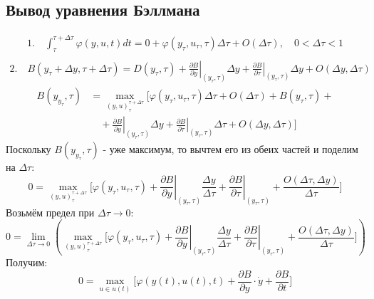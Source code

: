 \documentclass[a4paper,12pt]{article}
\begin{document}
{\subsection{Вывод уравнения Бэллмана}
\begin{align}
   1. \quad \int_{\tau}^{\tau + \Delta \tau} \varphi(y, u, t) dt = 0 + \varphi(y_{\tau}, u_{\tau}, \tau) \Delta \tau + O(\Delta \tau),\quad 0 < \Delta \tau < 1 \\
\end{align} 
\begin{align}
   2. \quad B(y_{\tau}+\Delta y, \tau + \Delta \tau) = D(y_{\tau},\tau) +  \left. \frac{\partial B}{\partial y} \right|_{(y_{\tau},\tau)} \! \Delta y + \left. \frac{\partial B}{\partial \tau} \right|_{(y_{\tau},\tau)} \! \Delta y + O(\Delta y, \Delta \tau)
\end{align}
\begin{align}
    B(y_{y_{\tau}},\tau) &= \max_{(y,u)_{\tau}^{\tau+\Delta \tau}} \biggl[ \varphi(y_{\tau}, u_{\tau}, \tau) \Delta \tau + O(\Delta \tau) + B(y_{\tau},\tau) \nonumber + \\
    &\quad + \left. \frac{\partial B}{\partial y} \right|_{(y_{\tau},\tau)}\! \Delta y + \left. \frac{\partial B}{\partial \tau} \right|_{(y_{\tau},\tau)}\! \Delta \tau + O(\Delta y,\Delta \tau) \biggr]
\end{align}
Поскольку $B(y_{y_{\tau}},\tau)$ - уже максимум, то вычтем его из обеих частей и поделим на $\Delta \tau$:
\[
    0 = \max_{(y,u)_{\tau}^{\tau+\Delta \tau}} \biggl[ \varphi(y_{\tau},u_{\tau},\tau) + \left. \frac{\partial B}{\partial y} \right|_{(y_{\tau},\tau)}\! \frac{\Delta y}{\Delta \tau} + \left. \frac{\partial B}{\partial \tau} \right|_{(y_{\tau},\tau)} + \frac{O(\Delta \tau,\Delta y)}{\Delta \tau}\biggr]
\]
Возьмём предел при $\Delta \tau \rightarrow 0$:
\[
    0  = \lim_{\Delta \tau \to 0} \left(\max_{(y,u)_{\tau}^{\tau+\Delta \tau}} \biggl[ \varphi(y_{\tau},u_{\tau},\tau) + \left. \frac{\partial B}{\partial y} \right|_{(y_{\tau},\tau)}\! \frac{\Delta y}{\Delta \tau} + \left. \frac{\partial B}{\partial \tau} \right|_{(y_{\tau},\tau)} + \frac{O(\Delta \tau,\Delta y)}{\Delta \tau}\biggr] \right)
\]
Получим:
\[
    0 = \max_{u \in u(t)} \biggl[ \varphi(y(t),u(t),t) + \frac{\partial B}{\partial y}\cdot \dot{y} +  \frac{\partial B}{\partial t} \biggr]
\]

}
\end{document}
